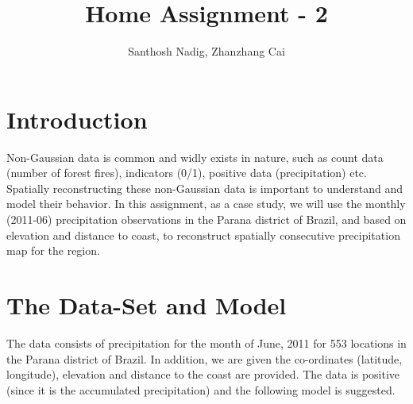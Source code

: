 \documentclass[a4paper,10pt]{article}
\title{Home Assignment - 2}
\author{Santhosh Nadig, Zhanzhang Cai}
\begin{document}
\maketitle

\section{Introduction}
Non-Gaussian data is common and widly exists in nature, such as count data (number of forest fires), indicators (0/1), positive data (precipitation) etc. Spatially reconstructing these non-Gaussian data is important to understand and model their behavior. In this assignment, as a case study, we will use the monthly (2011-06) precipitation observations in the Parana district of Brazil, and based on elevation and distance to coast, to reconstruct spatially consecutive precipitation map for the region.  

\section{The Data-Set and Model}
\label{sec:model}
The data consists of precipitation for the month of June, 2011 for 553 locations in the Parana district of Brazil. In addition, we are given the co-ordinates (latitude, longitude), elevation and distance to the coast are provided. The data is positive (since it is the accumulated precipitation) and the following model is suggested.
\end{document}
